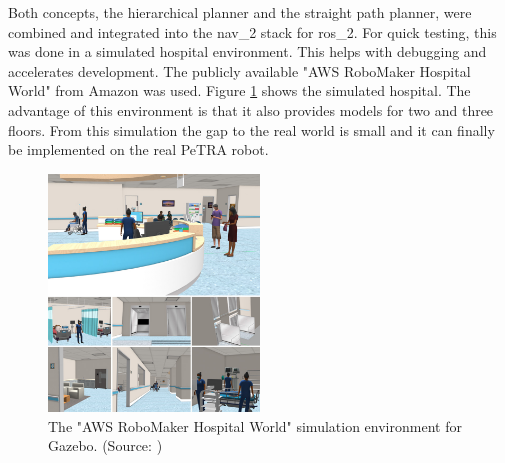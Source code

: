 Both concepts, the hierarchical planner and the straight path planner, were combined and integrated into the \gls{nav_2} stack for \gls{ros_2}. For quick testing, this was done in a simulated hospital environment. This helps with debugging and accelerates development. The publicly available "AWS RoboMaker Hospital World" from Amazon \cite{aws_robotics_aws_2023} was used. Figure \ref{fig:aws_hospital} shows the simulated hospital. The advantage of this environment is that it also provides models for two and three floors. From this simulation the gap to the real world is small and it can finally be implemented on the real PeTRA robot.

\begin{figure}[h]
    \centering
    \includegraphics[width=0.5\textwidth]{figures/30_methods/hospital_world.jpg}
    \caption[The "AWS RoboMaker Hospital World" simulation environment for Gazebo]{The "AWS RoboMaker Hospital World" simulation environment for Gazebo. (Source: \cite{aws_robotics_aws_2023})}
    \label{fig:aws_hospital}
\end{figure}